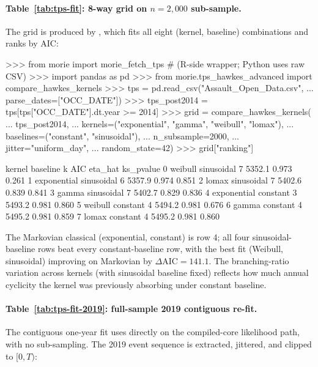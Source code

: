 \documentclass[article,shortnames,nojss]{jss}
\newcommand{\1}{\mathbbm{1}}
\theoremstyle{plain}
\theoremstyle{definition}
\begin{document}
\paragraph{Table~\ref{tab:tps-fit}: 8-way grid on $n=2{,}000$ sub-sample.}
The grid is produced by , which fits
all eight (kernel, baseline) combinations and ranks by AIC:

\begin{CodeChunk}
\begin{CodeInput}
>>> from morie import morie_fetch_tps  # (R-side wrapper; Python uses raw CSV)
>>> import pandas as pd
>>> from morie.tps_hawkes_advanced import compare_hawkes_kernels
>>> tps = pd.read_csv("Assault_Open_Data.csv",
...                    parse_dates=["OCC_DATE"])
>>> tps_post2014 = tps[tps["OCC_DATE"].dt.year >= 2014]
>>> grid = compare_hawkes_kernels(
...     tps_post2014,
...     kernels=("exponential", "gamma", "weibull", "lomax"),
...     baselines=("constant", "sinusoidal"),
...     n_subsample=2000,
...     jitter="uniform_day",
...     random_state=42)
>>> grid["ranking"]
\end{CodeInput}
\begin{CodeOutput}
       kernel     baseline  k          AIC    eta_hat    ks_pvalue
0    weibull   sinusoidal   7      5352.1      0.973        0.261
1 exponential  sinusoidal   6      5357.9      0.974        0.851
2      lomax   sinusoidal   7      5402.6      0.839        0.841
3      gamma   sinusoidal   7      5402.7      0.829        0.836
4 exponential    constant   3      5493.2      0.981        0.860
5    weibull    constant   4      5494.2      0.981        0.676
6      gamma     constant   4      5495.2      0.981        0.859
7      lomax     constant   4      5495.2      0.981        0.860
\end{CodeOutput}
\end{CodeChunk}

The Markovian classical (exponential, constant) is row 4; all four
sinusoidal-baseline rows beat every constant-baseline row, with the
best fit (Weibull, sinusoidal) improving on Markovian by
$\Delta\mathrm{AIC} = 141.1$.  The branching-ratio variation across
kernels (with sinusoidal baseline fixed) reflects how much annual
cyclicity the kernel was previously absorbing under constant baseline.

\paragraph{Table~\ref{tab:tps-fit-2019}: full-sample 2019 contiguous re-fit.}
The contiguous one-year fit uses 
directly on the compiled-core likelihood path, with no
sub-sampling.  The 2019 event sequence is extracted, jittered, and
clipped to $[0, T)$:
\end{document}
